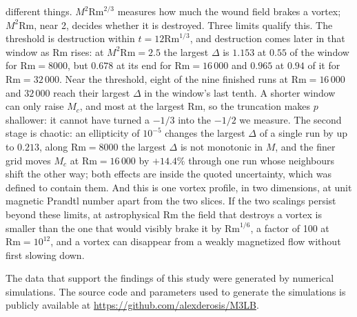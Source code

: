 \documentclass[aps,prl,twocolumn,reprint,amsmath,amssymb,superscriptaddress,floatfix]{revtex4-2}
\newcommand{\Rm}{\mathrm{Rm}}
\begin{document}
different things. $M^2\Rm^{2/3}$ measures how much the wound field brakes a vortex;
$M^2\Rm$, near 2, decides whether it is destroyed. Three limits qualify this. The
threshold is destruction within $t=12\Rm^{1/3}$, and destruction comes later in
that window as $\Rm$ rises: at $M^2\Rm=2.5$ the largest $\Delta$ is $1.153$ at
$0.55$ of the window for $\Rm=8000$, but $0.678$ at its end for $\Rm=16\,000$ and
$0.965$ at $0.94$ of it for $\Rm=32\,000$. Near the threshold, eight of the nine finished runs at
$\Rm=16\,000$ and $32\,000$ reach their largest $\Delta$ in the window's last tenth. A shorter window can only raise
$M_c$, and most at the largest $\Rm$, so the truncation makes $p$ shallower: it
cannot have turned a $-1/3$ into the $-1/2$ we measure. The second stage is
chaotic: an ellipticity of $10^{-5}$ changes the largest $\Delta$ of a single run
by up to $0.213$, along $\Rm=8000$ the largest $\Delta$ is not monotonic in $M$,
and the finer grid moves $M_c$ at $\Rm=16\,000$ by $+14.4\%$ through one run whose
neighbours shift the other way; both effects are inside the quoted uncertainty,
which was defined to contain them. And this is one vortex profile, in two
dimensions, at unit magnetic Prandtl number apart from the two slices. If the two
scalings persist beyond these limits, at astrophysical $\Rm$ the field that
destroys a vortex is smaller than the one that would visibly brake it by
$\Rm^{1/6}$, a factor of 100 at $\Rm=10^{12}$, and a vortex can disappear from a
weakly magnetized flow without first slowing down.


\begin{acknowledgments}
The data that support the findings of this study were generated by numerical simulations. The source code and parameters used to generate the simulations is publicly available at \url{https://github.com/alexderosis/M3LB}.
\end{acknowledgments}


\end{document}
